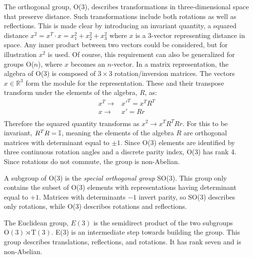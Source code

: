 The orthogonal group, O(3), describes transformations in three-dimensional space that preserve distance.
Such transformations include both rotations as well as reflections. 
This is made clear by introducing an invariant quantity, a squared distance $x^2=x^T\cdot x=x_1^2+x_2^2+x_3^2$ where $x$ is a 3-vector representing distance in space. 
Any inner product between two vectors could be considered, but for illustration $x^2$ is used.
Of course, this requirement can also be generalized for groups O($n$), where $x$ becomes an $n$-vector.
In a matrix representation, the algebra of O(3) is composed of $3\times3$ rotation/inversion matrices.
The vectors $x\in\mathbb{R}^3$ form the module for the representation.
These and their transpose transform under the elements of the algebra, $R$, as:
\begin{equation}\begin{split}\label{eqn:oTransform}
    x^T\to&x'^T=x^TR^T \\
    x\to&x'=Rr \\
\end{split}\end{equation}
Therefore the squared quantity transforms as $x^2\to x^TR^TRr$.
For this to be invariant, $R^TR=\mathbb{I}$, meaning the elements of the algebra $R$ are orthogonal matrices with determinant equal to $\pm1$.
Since O(3) elements are identified by three continuous rotation angles and a discrete parity index, O(3) has rank 4.
Since rotations do not commute, the group is non-Abelian.

A subgroup of O(3) is the \emph{special orthogonal group} SO(3).
This group only contains the subset of O(3) elements with representations having determinant equal to $+1$.
Matrices with determinants $-1$ invert parity, so SO(3) describes only rotations, while O(3) describes rotations and reflections.

The Euclidean group, $E(3)$ is the semidirect product of the two subgroups $\text{O}(3)\rtimes\text{T}(3)$.
E(3) is an intermediate step towards building the \poincare group.
This group describes translations, reflections, and rotations.
It has rank seven and is non-Abelian.

